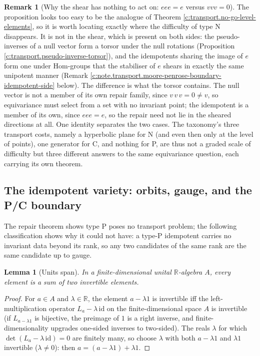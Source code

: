 \documentclass[11pt]{article}
\newtheorem{lemma}[theorem]{Lemma}
\theoremstyle{definition}
\newtheorem{remark}[theorem]{Remark}
\theoremstyle{plain}
\providecommand{\R}{}\renewcommand{\R}{\mathbb{R}}
\begin{document}
\begin{remark}[Why the shear has nothing to act on: $eee = e$ versus $vvv = 0$]\label{c:note.transport.why-shear-has-nothing-act-eee}
The proposition looks too easy to be the analogue of Theorem \ref{c:transport.no-go-level-elements}, so it is worth locating exactly where the difficulty of type N disappears. It is not in the shear, which is present on both sides: the pseudo-inverses of a null vector form a torsor under the null rotations (Proposition \ref{c:transport.pseudo-inverse-torsor}), and the idempotents sharing the image of $e$ form one under $\mathrm{Hom}$-groups that the stabiliser of $e$ shears in exactly the same unipotent manner (Remark \ref{c:note.transport.moore-penrose-boundary-idempotent-side} below). The difference is what the torsor contains. The null vector is not a member of its own repair family, since $v\,v\,v = 0 \neq v$, so equivariance must select from a set with no invariant point; the idempotent is a member of its own, since $eee = e$, so the repair need not lie in the sheared directions at all. One identity separates the two cases. The taxonomy's three transport costs, namely a hyperbolic plane for N (and even then only at the level of points), one generator for C, and nothing for P, are thus not a graded scale of difficulty but three different answers to the same equivariance question, each carrying its own theorem.
\end{remark}

\subsection*{The idempotent variety: orbits, gauge, and the P/C boundary}
\label{c:note.transport.setting-idempotent-variety-orbits-gauge-p}
The repair theorem shows type P poses no transport problem; the following classification shows why it could not have: a type-P idempotent carries no invariant data beyond its rank, so any two candidates of the same rank are the same candidate up to gauge.

\begin{lemma}[Units span]\label{c:transport.units-span}
In a finite-dimensional unital $\R$-algebra $A$, every element is a sum of two invertible elements.
\end{lemma}
\begin{proof}
For $a \in A$ and $\lambda \in \R$, the element $a - \lambda 1$ is invertible iff the left-multiplication operator $L_a - \lambda\, \mathrm{id}$ on the finite-dimensional space $A$ is invertible (if $L_{a - \lambda 1}$ is bijective, the preimage of $1$ is a right inverse, and finite-dimensionality upgrades one-sided inverses to two-sided). The reals $\lambda$ for which $\det(L_a - \lambda\,\mathrm{id}) = 0$ are finitely many, so choose $\lambda$ with both $a - \lambda 1$ and $\lambda 1$ invertible ($\lambda \neq 0$): then $a = (a - \lambda 1) + \lambda 1$.

\end{proof}
\end{document}
